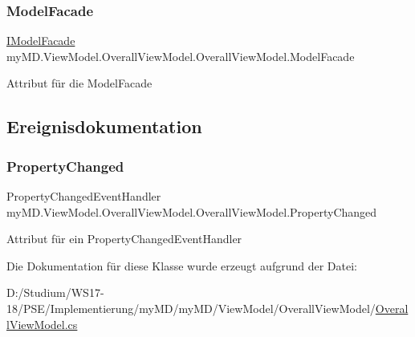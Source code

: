 \subsubsection{\texorpdfstring{Model\+Facade}{ModelFacade}}
{\footnotesize\ttfamily \mbox{\hyperlink{interfacemy_m_d_1_1_model_interface_1_1_model_facade_interface_1_1_i_model_facade}{I\+Model\+Facade}} my\+M\+D.\+View\+Model.\+Overall\+View\+Model.\+Overall\+View\+Model.\+Model\+Facade\hspace{0.3cm}{\ttfamily [protected]}}



Attribut für die Model\+Facade 



\subsection{Ereignisdokumentation}
\mbox{\label{classmy_m_d_1_1_view_model_1_1_overall_view_model_1_1_overall_view_model_a1918d3d8d384486e278426327b16256f}} 
\subsubsection{\texorpdfstring{Property\+Changed}{PropertyChanged}}
{\footnotesize\ttfamily Property\+Changed\+Event\+Handler my\+M\+D.\+View\+Model.\+Overall\+View\+Model.\+Overall\+View\+Model.\+Property\+Changed}



Attribut für ein Property\+Changed\+Event\+Handler 



Die Dokumentation für diese Klasse wurde erzeugt aufgrund der Datei\+:\begin{DoxyCompactItemize}
\item 
D\+:/\+Studium/\+W\+S17-\/18/\+P\+S\+E/\+Implementierung/my\+M\+D/my\+M\+D/\+View\+Model/\+Overall\+View\+Model/\mbox{\hyperlink{_overall_view_model_8cs}{Overall\+View\+Model.\+cs}}\end{DoxyCompactItemize}
